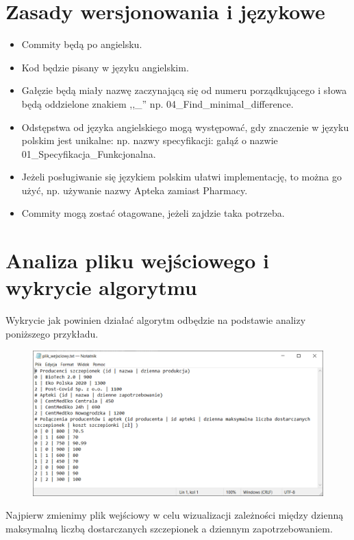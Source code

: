 \documentclass{article}
\begin{document}
\clearpage

\section{Zasady wersjonowania i językowe}
\begin{itemize}
    \item Commity będą po angielsku.
    \item Kod będzie pisany w języku angielskim.
    \item Gałęzie będą miały nazwę zaczynającą się od numeru porządkującego i słowa będą oddzielone znakiem ,,\_'' np. 04\_Find\_minimal\_difference.
    \item Odstępstwa od języka angielskiego mogą występować, gdy znaczenie w języku polskim jest unikalne: np. nazwy specyfikacji: gałąź o nazwie 01\_Specyfikacja\_Funkcjonalna.
    \item Jeżeli posługiwanie się językiem polskim ułatwi implementację, to można go użyć, np. używanie nazwy Apteka zamiast Pharmacy.
    \item Commity mogą zostać otagowane, jeżeli zajdzie taka potrzeba.
\end{itemize}

\section{Analiza pliku wejściowego i wykrycie algorytmu}
Wykrycie jak powinien działać algorytm odbędzie na podstawie analizy poniższego przykładu.

\begin{figure} [hbt!]
    \includegraphics[width=18cm,center]{images/plik_wejsciowy.PNG}
\end{figure}

\clearpage

Najpierw zmienimy plik wejściowy w celu wizualizacji zależności między dzienną maksymalną liczbą dostarczanych szczepionek a dziennym zapotrzebowaniem.
\end{document}
